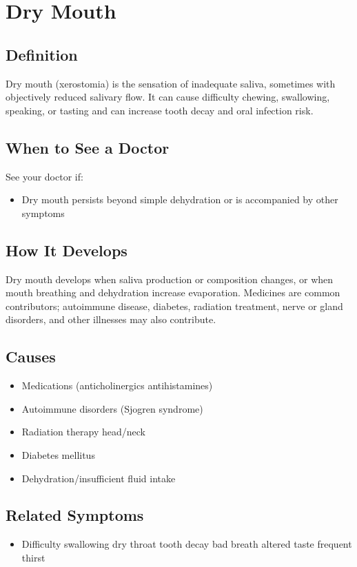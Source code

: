 \chapter{Dry Mouth}

\section*{Definition}
Dry mouth (xerostomia) is the sensation of inadequate saliva, sometimes with objectively reduced salivary flow. It can cause difficulty chewing, swallowing, speaking, or tasting and can increase tooth decay and oral infection risk.

\section*{When to See a Doctor}
See your doctor if:
\begin{itemize}
  \item Dry mouth persists beyond simple dehydration or is accompanied by other symptoms
\end{itemize}

\section*{How It Develops}
Dry mouth develops when saliva production or composition changes, or when mouth breathing and dehydration increase evaporation. Medicines are common contributors; autoimmune disease, diabetes, radiation treatment, nerve or gland disorders, and other illnesses may also contribute.

\section*{Causes}
\begin{itemize}
  \item Medications (anticholinergics antihistamines)
  \item Autoimmune disorders (Sjogren syndrome)
  \item Radiation therapy head/neck
  \item Diabetes mellitus
  \item Dehydration/insufficient fluid intake
\end{itemize}

\section*{Related Symptoms}
\begin{itemize}
  \item Difficulty swallowing dry throat tooth decay bad breath altered taste frequent thirst
\end{itemize}


